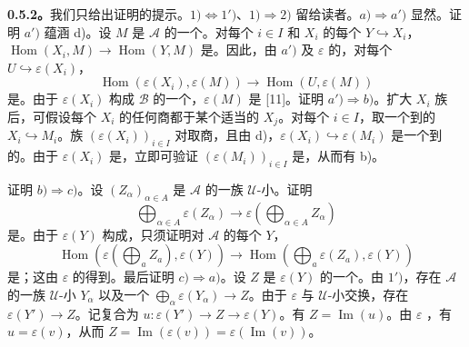 \textbf{0.5.2。}我们只给出证明的提示。$1)\Leftrightarrow1')$、$1)\Rightarrow2)$ 留给读者。$a)\Rightarrow a')$ 显然。证明 $a')$ 蕴涵 d)。设 $M$ 是 $\mathcal A$ 的一个。对每个 $i\in I$ 和 $X_i$ 的每个 $Y\hookrightarrow X_i$， $\operatorname{Hom}(X_i,M)\to\operatorname{Hom}(Y,M)$ 是。因此，由 $a')$ 及 $\varepsilon$ 的，对每个 $U\hookrightarrow\varepsilon(X_i)$，
\[
 \operatorname{Hom}(\varepsilon(X_i),\varepsilon(M))\longrightarrow
 \operatorname{Hom}(U,\varepsilon(M))
\]
是。由于 $\varepsilon(X_i)$ 构成 $\mathcal B$ 的一个，$\varepsilon(M)$ 是 [11]。证明 $a')\Rightarrow b)$。扩大 $X_i$ 族后，可假设每个 $X_i$ 的任何商都于某个适当的 $X_j$。对每个 $i\in I$，取一个到的 $X_i\hookrightarrow M_i$。族 $(\varepsilon(X_i))_{i\in I}$ 对取商，且由 d)，$\varepsilon(X_i)\hookrightarrow\varepsilon(M_i)$ 是一个到的。由于 $\varepsilon(X_i)$ 是，立即可验证 $(\varepsilon(M_i))_{i\in I}$ 是，从而有 b)。

证明 $b)\Rightarrow c)$。设 $(Z_\alpha)_{\alpha\in A}$ 是 $\mathcal A$ 的一族 $\mathcal U$-小。证明
\[
 \bigoplus_{\alpha\in A}\varepsilon(Z_\alpha)\longrightarrow
 \varepsilon\left(\bigoplus_{\alpha\in A}Z_\alpha\right)
\]
是。由于 $\varepsilon(Y)$ 构成，只须证明对 $\mathcal A$ 的每个 $Y$，
\[
 \operatorname{Hom}\left(\varepsilon(\bigoplus_a Z_a),\varepsilon(Y)\right)
 \longrightarrow\operatorname{Hom}\left(\bigoplus_a\varepsilon(Z_a),\varepsilon(Y)\right)
\]
是；这由 $\varepsilon$ 的得到。最后证明 $c)\Rightarrow a)$。设 $Z$ 是 $\varepsilon(Y)$ 的一个。由 $1')$，存在 $\mathcal A$ 的一族 $\mathcal U$-小 $Y_\alpha$ 以及一个 $\bigoplus_\alpha\varepsilon(Y_\alpha)\to Z$。由于 $\varepsilon$ 与 $\mathcal U$-小交换，存在 $\varepsilon(Y')\to Z$。记复合为 $u:\varepsilon(Y')\to Z\to\varepsilon(Y)$。有 $Z=\operatorname{Im}(u)$。由 $\varepsilon$ ，有 $u=\varepsilon(v)$，从而
$Z=\operatorname{Im}(\varepsilon(v))=\varepsilon(\operatorname{Im}(v))$。

